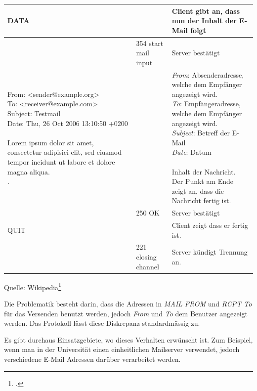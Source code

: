 \begin{table}[H]
\begin{tabular}{ | p{5cm} | p{2cm} | p{6cm} |}
  			DATA &  
  			& 
  			Client gibt an, dass nun der Inhalt der E-Mail folgt\\ \hline
  			
  			& 354 start mail input & Server bestätigt\\ \hline
  			
  			\parbox[t]{5cm}{From: <sender@example.org>\\
  			To: <receiver@example.com>\\
  			Subject: Testmail\\
  			Date: Thu, 26 Oct 2006 13:10:50 +0200\\
  			\\
  			Lorem ipsum dolor sit amet, consectetur adipisici elit, sed eiusmod tempor incidunt ut labore et dolore magna aliqua.\\
  			.} &  
  			& 
  			\parbox[t]{6cm}{
  			\textit{From}: Absenderadresse, welche dem Empfänger angezeigt wird.\\
  			\textit{To}: Empfängeradresse, welche dem Empfänger angezeigt wird.\\
  			\textit{Subject}: Betreff der E-Mail\\
  			\textit{Date}: Datum\\
  			\\
  			Inhalt der Nachricht.\\
  			Der Punkt am Ende zeigt an, dass die Nachricht fertig ist.
  			}\\ \hline
  					
  			& 250 OK & Server bestätigt\\ \hline
  			
  			QUIT &  & Client zeigt dass er fertig ist.\\ \hline
  	
  			& 221 closing channel & Server kündigt Trennung an.\\ \hline
    \end{tabular}
\end{table}
Quelle: Wikipedia\footcite{Simple_Mail_Transfer_Protocol__Wikipedia_2015-05-18}

Die Problematik besteht darin, dass die Adressen in \textit{MAIL FROM} und \textit{RCPT To} für das Versenden benutzt werden, jedoch \textit{From} und \textit{To} dem Benutzer angezeigt werden. Das Protokoll lässt diese Diskrepanz standardmässig zu.

Es gibt durchaus Einsatzgebiete, wo dieses Verhalten erwünscht ist. Zum Beispiel, wenn man in der Universität einen einheitlichen Mailserver verwendet, jedoch verschiedene E-Mail Adressen darüber verarbeitet werden.

